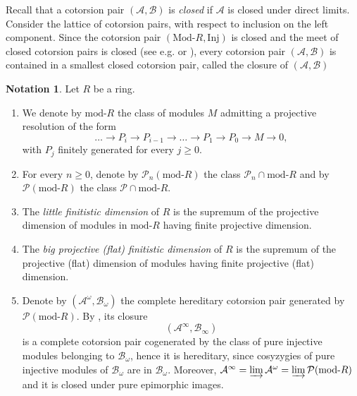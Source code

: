 \documentclass[11pt,a4paper,reqno]{amsart}
\newcommand{\A}{\mathcal{A}}
\newcommand{\B}{\mathcal{B}}
\newcommand{\clP}{\mathcal{P}}
\newcommand{\Modr}[1]{\mathrm{Mod}\textrm{-}{#1}}
\newcommand{\modr}[1]{\mathrm{mod}\textrm{-}{#1}}
\newcommand{\Inj}{\mathrm{Inj}}
\theoremstyle{plain}
\theoremstyle{definition}
\newtheorem{nota}[thm]{Notation}
\theoremstyle{remark}
\begin{document}
 Recall that a cotorsion pair  $(\A, \B)$ is \emph{closed} if $\A$ is closed under direct limits. Consider the lattice of cotorsion pairs, with respect to inclusion on the left component.
Since the cotorsion pair $(\Modr R, \Inj)$ is closed and the meet of closed cotorsion pairs is closed (see e.g. \cite{AT} or \cite[Lemma 6.1]{G6}), every cotorsion pair $(\A, \B)$ is contained in a smallest closed cotorsion pair, called the closure of $(\A, \B)$
\begin{nota}\label{N:notations} Let $R$ be a ring.
\begin{enumerate}
\item We denote by $\modr R$ the class of modules $M$ admitting a projective resolution of the form
\[\dots\to P_i\to P_{i-1}\to \dots\to P_1\to P_0\to M\to 0,\]
with $P_j$ finitely generated  for every $j \geq 0$.
\item For every $n\geq 0$, denote by $\clP_n(\modr R)$  the class $\clP_n\cap\modr R$ and by $\clP(\modr R)$  the class $ \clP\cap\modr R$.
%
\item The \emph{little finitistic dimension} of $R$ is the supremum of the projective dimension of modules in $\modr R$ having finite projective dimension.
\item The \emph{big projective (flat) finitistic dimension}  of $R$ is  the supremum of the projective (flat) dimension of modules having finite projective (flat) dimension.
\item Denote by $(\A^{\omega}, \B_{\omega})$ the complete hereditary cotorsion pair generated by $\clP(\modr R)$. By \cite[Theorem 2.3, Corollary 2.4]{AT}, its closure
\[(\A^{\infty}, \B_{\infty})
\]  is a complete cotorsion pair cogenerated by the class of pure injective modules belonging to $\B_{\omega}$, hence it is hereditary, since cosyzygies of pure injective modules of $\B_{\omega}$ are in $\B_{\omega}$. Moreover, $\A^{\infty}=\varinjlim \A^{\omega}=\varinjlim \clP(\modr R)$ and it is closed under pure epimorphic images.
\end{enumerate}
\end{nota}
\end{document}
